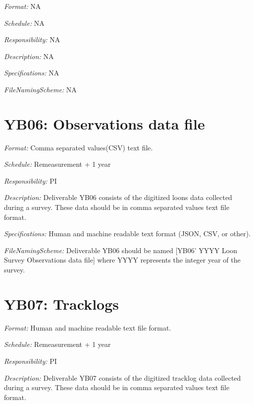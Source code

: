 \documentclass[
  letterpaper,
  DIV=11,
  numbers=noendperiod]{scrreprt}
\begin{document}

\emph{Format:} NA

\emph{Schedule:} NA

\emph{Responsibility:} NA

\emph{Description:} NA

\emph{Specifications:} NA

\emph{FileNamingScheme:} NA


\chapter*{YB06: Observations data
file}\label{yb06-observations-data-file}


\emph{Format:} Comma separated values(CSV) text file.

\emph{Schedule:} Remeasurement + 1 year

\emph{Responsibility:} PI

\emph{Description:} Deliverable YB06 consists of the digitized loons
data collected during a survey. These data should be in comma separated
values text file format.

\emph{Specifications:} Human and machine readable text format (JSON,
CSV, or other).

\emph{FileNamingScheme:} Deliverable YB06 should be named {[}YB06' YYYY
Loon Survey Observations data file{]} where YYYY represents the integer
year of the survey.


\chapter*{YB07: Tracklogs}\label{yb07-tracklogs}


\emph{Format:} Human and machine readable text file format.

\emph{Schedule:} Remeasurement + 1 year

\emph{Responsibility:} PI

\emph{Description:} Deliverable YB07 consists of the digitized tracklog
data collected during a survey. These data should be in comma separated
values text file format.
\end{document}
